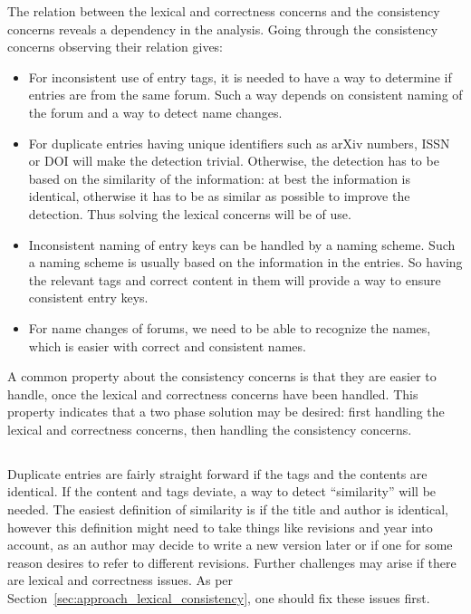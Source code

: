The relation between the lexical and correctness concerns and the
consistency concerns reveals a dependency in the analysis.  Going
through the consistency concerns observing their relation gives:

\begin{itemize}
\item For inconsistent use of entry tags, it is needed to have a way
  to determine if entries are from the same forum.  Such a
  way depends on consistent naming of the forum and a way to detect
  name changes.

\item For duplicate entries having unique identifiers such as arXiv
  numbers, ISSN or DOI will make the detection trivial.  Otherwise,
  the detection has to be based on the similarity of the information:
  at best the information is identical, otherwise it has to be as
  similar as possible to improve the detection.  Thus solving the
  lexical concerns will be of use.

\item Inconsistent naming of entry keys can be handled by a naming
  scheme.  Such a naming scheme is usually based on the information in
  the entries.  So having the relevant tags and correct content in
  them will provide a way to ensure consistent entry keys.

\item For name changes of forums, we need to be able to recognize the
  names, which is easier with correct and consistent names.
\end{itemize}

A common property about the consistency concerns is that they are
easier to handle, once the lexical and correctness concerns have been
handled.  This property indicates that a two phase solution may be
desired: first handling the lexical and correctness concerns, then
handling the consistency concerns.


\subsection{}
\label{sec:approach_duplicates}

Duplicate entries are fairly straight forward if the tags and the
contents are identical.  If the content and tags deviate, a way to
detect ``similarity'' will be needed.  The easiest definition of
similarity is if the title and author is identical, however this
definition might need to take things like revisions and year into
account, as an author may decide to write a new version later or if
one for some reason desires to refer to different revisions.  Further
challenges may arise if there are lexical and correctness issues.  As
per Section~\ref{sec:approach_lexical_consistency}, one should fix
these issues first.


